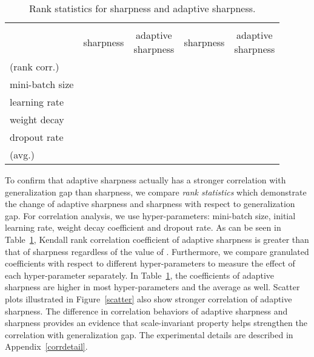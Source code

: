 \documentclass{article}
\begin{document}
\begin{table}[t]
\ificml
\else
    \centering
    \captionsetup{justification=centering}
\fi
\setlength\tabcolsep{3.5pt}
\caption{Rank statistics for sharpness and adaptive sharpness. \label{rank}}
\begin{center}
\begin{small}
\begin{tabular}{lcccc}
\toprule
\multirow{2}{*}{} & \multicolumn{2}{c}{} & \multicolumn{2}{c}{}\\
\cmidrule{2-5}
& \multirow{1}{*}{sharpness} & \makecell{adaptive\\sharpness} & sharpness & \makecell{adaptive\\sharpness}\\
\midrule
 (rank corr.) &  &  &  & \\
mini-batch size &  &  &  & \\
learning rate &  &  &  & \\
weight decay &  &  &  & \\
dropout rate &  &  &  & \\
 (avg.) &  &  &  & \\
\bottomrule
\end{tabular}
\end{small}
\end{center}
\end{table}

To confirm that adaptive sharpness actually has a stronger correlation with generalization gap than sharpness, we compare \textit{rank statistics} which demonstrate the change of adaptive sharpness and sharpness with respect to generalization gap. For correlation analysis, we use  hyper-parameters: mini-batch size, initial learning rate, weight decay coefficient and dropout rate. As can be seen in Table~\ref{rank}, Kendall rank correlation coefficient \citep{kendall} of adaptive sharpness is greater than that of sharpness regardless of the value of . Furthermore, we compare granulated coefficients \citep{jiang2019fantastic} with respect to different hyper-parameters to measure the effect of each hyper-parameter separately. In Table~\ref{rank}, the coefficients of adaptive sharpness are higher in most hyper-parameters and the average as well. Scatter plots illustrated in Figure~\ref{scatter} also show stronger correlation of adaptive sharpness. The difference in correlation behaviors of adaptive sharpness and sharpness provides an evidence that scale-invariant property helps strengthen the correlation with generalization gap. The experimental details are described in Appendix~\ref{corrdetail}.
\end{document}
